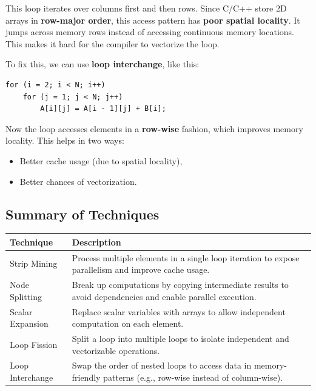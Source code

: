 \documentclass[12pt]{book}
\begin{document}
This loop iterates over columns first and then rows. Since C/C++ store 2D arrays in \textbf{row-major order}, this access pattern has \textbf{poor spatial locality}. It jumps across memory rows instead of accessing continuous memory locations. This makes it hard for the compiler to vectorize the loop.

To fix this, we can use \textbf{loop interchange}, like this:

\begin{lstlisting}[style=cppstyle]
for (i = 2; i < N; i++)
    for (j = 1; j < N; j++)
        A[i][j] = A[i - 1][j] + B[i];
\end{lstlisting}

Now the loop accesses elements in a \textbf{row-wise} fashion, which improves memory locality. This helps in two ways:
\begin{itemize}
    \item Better cache usage (due to spatial locality),
    \item Better chances of vectorization.
\end{itemize}

\subsection{Summary of Techniques}

\begin{center}
\begin{tabular}{|l|p{10cm}|}
\hline
\textbf{Technique} & \textbf{Description} \\
\hline
Strip Mining & Process multiple elements in a single loop iteration to expose parallelism and improve cache usage. \\
\hline
Node Splitting & Break up computations by copying intermediate results to avoid dependencies and enable parallel execution. \\
\hline
Scalar Expansion & Replace scalar variables with arrays to allow independent computation on each element. \\
\hline
Loop Fission & Split a loop into multiple loops to isolate independent and vectorizable operations. \\
\hline
Loop Interchange & Swap the order of nested loops to access data in memory-friendly patterns (e.g., row-wise instead of column-wise). \\
\hline
\end{tabular}
\end{center}
\end{document}
